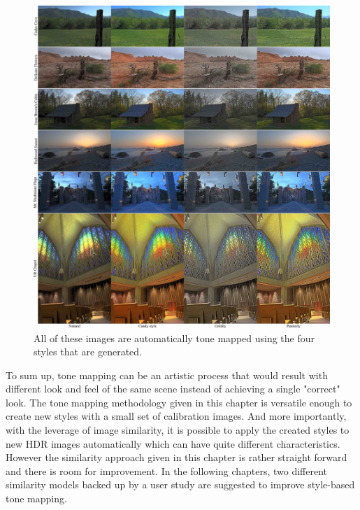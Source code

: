 \begin{figure}
\begin{center}
\includegraphics[width=\textwidth]{figures/chapter5/style_based/gallery_small.jpg}
\caption{All of these images are automatically tone mapped using the four styles that are generated.}
\label{fig:gallery}
\end{center}
\end{figure}

To sum up, tone mapping can be an artistic process that would result with different look and feel of the same scene instead of achieving a single "correct" look. The tone mapping methodology given in this chapter is versatile enough to create new styles with a small set of calibration images. And more importantly, with the leverage of image similarity, it is possible to apply the created styles to new HDR images automatically which can have quite different characteristics. However the similarity approach given in this chapter is rather straight forward and there is room for improvement. In the following chapters, two different similarity models backed up by a user study are suggested to improve style-based tone mapping.